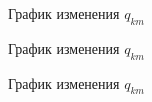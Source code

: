 \documentclass[bachelor,subf,14pt, substylefile = spbu.rtx]{disser}
\begin{document}
\begin{figure}[H]
\centering
\scalebox{0.8}{}
\caption{График изменения $q_{km}$}
\label{fig:q_km_1}
\end{figure}
\begin{figure}[H]
\centering
\scalebox{0.8}{}
\caption{График изменения $q_{km}$}
\label{fig:q_km_2}
\end{figure}
\begin{figure}[H]
\centering
\scalebox{0.8}{}
\caption{График изменения $q_{km}$}
\label{fig:q_km_3}
\end{figure}
\end{document}
